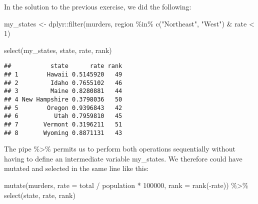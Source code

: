 \documentclass[
]{article}
\newenvironment{Shaded}{\begin{snugshade}}{\end{snugshade}}
\newcommand{\AttributeTok}[1]{\textcolor[rgb]{0.77,0.63,0.00}{#1}}
\newcommand{\DecValTok}[1]{\textcolor[rgb]{0.00,0.00,0.81}{#1}}
\newcommand{\FunctionTok}[1]{\textcolor[rgb]{0.00,0.00,0.00}{#1}}
\newcommand{\NormalTok}[1]{#1}
\newcommand{\OtherTok}[1]{\textcolor[rgb]{0.56,0.35,0.01}{#1}}
\newcommand{\SpecialCharTok}[1]{\textcolor[rgb]{0.00,0.00,0.00}{#1}}
\newcommand{\StringTok}[1]{\textcolor[rgb]{0.31,0.60,0.02}{#1}}
\begin{document}
In the solution to the previous exercise, we did the following:

\begin{Shaded}
\begin{Highlighting}[]
\NormalTok{my\_states }\OtherTok{\textless{}{-}}\NormalTok{ dplyr}\SpecialCharTok{::}\FunctionTok{filter}\NormalTok{(murders, region }\SpecialCharTok{\%in\%} \FunctionTok{c}\NormalTok{(}\StringTok{"Northeast"}\NormalTok{, }\StringTok{"West"}\NormalTok{) }\SpecialCharTok{\&} 
\NormalTok{                      rate }\SpecialCharTok{\textless{}} \DecValTok{1}\NormalTok{)}

\FunctionTok{select}\NormalTok{(my\_states, state, rate, rank)}
\end{Highlighting}
\end{Shaded}

\begin{verbatim}
##           state      rate rank
## 1        Hawaii 0.5145920   49
## 2         Idaho 0.7655102   46
## 3         Maine 0.8280881   44
## 4 New Hampshire 0.3798036   50
## 5        Oregon 0.9396843   42
## 6          Utah 0.7959810   45
## 7       Vermont 0.3196211   51
## 8       Wyoming 0.8871131   43
\end{verbatim}

The pipe \%\textgreater\% permits us to perform both operations
sequentially without having to define an intermediate variable
my\_states. We therefore could have mutated and selected in the same
line like this:

\begin{Shaded}
\begin{Highlighting}[]
\FunctionTok{mutate}\NormalTok{(murders, }\AttributeTok{rate =}\NormalTok{  total }\SpecialCharTok{/}\NormalTok{ population }\SpecialCharTok{*} \DecValTok{100000}\NormalTok{, }
       \AttributeTok{rank =} \FunctionTok{rank}\NormalTok{(}\SpecialCharTok{{-}}\NormalTok{rate)) }\SpecialCharTok{\%\textgreater{}\%}
  \FunctionTok{select}\NormalTok{(state, rate, rank)}
\end{Highlighting}
\end{Shaded}
\end{document}
